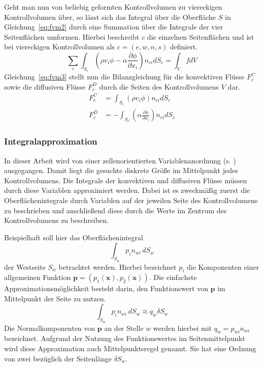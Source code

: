 Geht man nun von beliebig geformten Kontrollvolumen zu viereckigen Kontrollvolumen über,
so lässt sich das Integral über die Oberfläche $S$ in Gleichung~\eqref{eq:fvm2} durch eine
Summation über die Integrale der vier Seitenflächen umformen. Hierbei beschreibt $c$ die
einzelnen Seitenflächen und ist bei viereckigen Kontrollvolumen als $c=(e,w,n,s)$ definiert.
\begin{equation}
  \sum_c \int_{S_c} \left(\rho v_i \phi - \alpha \frac{\partial \phi}{\partial x_i}
\right) n_{ci} dS_c = \int_V f dV\label{eq:fvm3}
\end{equation}
Gleichung~\eqref{eq:fvm3} stellt nun die Bilanzgleichung für die konvektiven Flüsse
$F_c^C$ sowie die diffusiven Flüsse $F_c^D$ durch die Seiten des Kontrollvolumens $V$ dar.
\begin{align}
  F_c^C &=  \int_{S_c} \left(\rho v_i \phi \right) n_{ci} dS_c \\
  F_c^D &=  -\int_{S_c} \left(\alpha \frac{\partial \phi}{\partial x_i}\right) n_{ci} dS_c 
\end{align}

\subsubsection{Integralapproximation}
\label{sec:fvm_intappr}

In dieser Arbeit wird von einer zellenorientierten Variablenanordnung (s. \cite{num_maschbau})
ausgegangen. Damit liegt die gesuchte diskrete Größe im Mittelpunkt jedes Kontrollvolumens.
Die Integrale der konvektiven und diffusiven Flüsse müssen durch diese Variablen
approximiert werden. Dabei ist es zweckmäßig zuerst die Oberflächenintegrale durch Variablen
auf der jeweilen Seite des Kontrollvolumens zu beschrieben und anschließend diese durch die Werte
im Zentrum des Kontrollvolumens zu beschreiben.

Beispielhaft soll hier das Oberflächenintegral
\begin{equation*}
  \int_{S_w} p_i n_{wi}\,dS_w
\end{equation*}
der Westseite $S_w$ betrachtet werden. Hierbei bezeichnet $p_i$ die Komponenten einer allgemeinen
Funktion $\mathbf{p} = (p_1(\mathbf{x}), p_2(\mathbf{x}))$. Die einfachste
Approximationsmöglichkeit besteht darin, den Funktionswert von $\mathbf{p}$ im Mittelpunkt
der Seite zu nutzen.
\begin{equation}
  \int_{S_w} p_i n_{wi}\,dS_w \approx q_w \delta S_w
\end{equation}
Die Normalkomponenten von $\mathbf{p}$ an der Stelle $w$ werden hierbei mit $q_w = p_{wi} n_{wi}$ bezeichnet.
Aufgrund der Nutzung des Funktionswertes im Seitenmittelpunkt wird diese Approximation auch Mittelpunktsregel genannt.
Sie hat eine Ordnung von zwei bezüglich der Seitenlänge $\delta S_w$.

